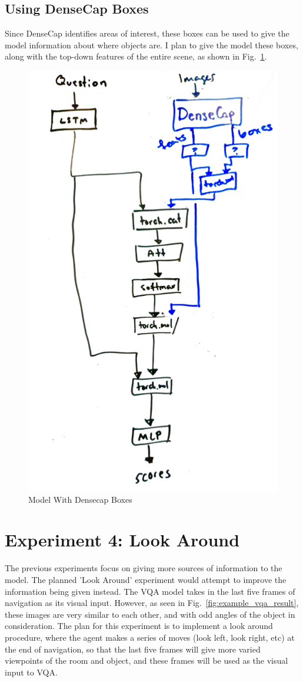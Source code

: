 \subsection{Using DenseCap Boxes}
Since DenseCap identifies areas of interest, these boxes can be used to give the model information about where objects are. I plan to give the model these boxes, along with the top-down features of the entire scene, as shown in Fig.~\ref{fig:densecap_boxes}. 


\begin{figure}[h]
     \centering
     \includegraphics[width=.5\textwidth]{./figure/densecapboxes.png}
     \caption{Model With Densecap Boxes}
     \label{fig:densecap_boxes}
\end{figure}

\section{Experiment 4: Look Around}
The previous experiments focus on giving more sources of information to the model. The planned 'Look Around' experiment would attempt to improve the information being given instead. The VQA model takes in the last five frames of navigation as its visual input. However, as seen in Fig.~\ref{fig:example_vqa_result}, these images are very similar to each other, and with odd angles of the object in consideration. The plan for this experiment is to implement a look around procedure, where the agent makes a series of moves (look left, look right, etc) at the end of navigation, so that the last five frames will give more varied viewpoints of the room and object, and these frames will be used as the visual input to VQA.


